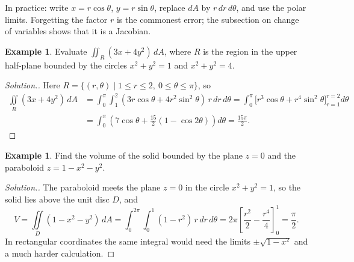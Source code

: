 \documentclass[11pt,a4paper]{article}
\theoremstyle{definition}
\newtheorem{exa}[thm]{Example}
\newenvironment{solution}
  {\renewcommand{\qedsymbol}{}\begin{proof}[\textit{Solution}.]}
  {\end{proof}}
\begin{document}
In practice: write $x = r\cos\theta$, $y = r\sin\theta$, replace $dA$ by
$r\,dr\,d\theta$, and use the polar limits. Forgetting the factor $r$ is the
commonest error; the subsection on change of variables shows that it is a
Jacobian.

\begin{exa}
\label{ex:polarannulus}
Evaluate $\iint_R (3x + 4y^2) \,dA$, where $R$ is the region in the upper
half-plane bounded by the circles $x^2 + y^2 = 1$ and $x^2 + y^2 = 4$.
\end{exa}

\begin{solution}
Here $R = \{ (r,\theta) \mid 1 \leq r \leq 2,\ 0\leq \theta \leq \pi\}$, so
\begin{align*}
\iint\limits_R (3x + 4y^2) \,dA & = \int^{\pi}_0\int^2_1(3r\cos \theta + 4r^2\sin^2
\theta )\, r\,dr\,d\theta = \int^{\pi}_0\Big[r^3\cos\theta +
r^4\sin^2\theta\Big]_{r=1}^{r=2}d\theta\\
& = \int^{\pi}_0\left(7\cos \theta + \frac{15}{2}( 1 - \cos 2\theta )\right)
d\theta = \frac{15\pi}{2} .
\end{align*}
\end{solution}

\begin{exa}
\label{ex:polarvolume}
Find the volume of the solid bounded by the plane $z = 0$ and the paraboloid
$z = 1-x^2 -y^2$.

\begin{figure}[H]
\centering
{}
\end{figure}
\end{exa}

\begin{solution}
The paraboloid meets the plane $z = 0$ in the circle $x^2 + y^2 = 1$, so the
solid lies above the unit disc $D$, and
\[V = \iint\limits_D (1-x^2-y^2)\,dA = \int^{2\pi}_0\int^1_0 ( 1 - r^2)\, r\,dr\,
d\theta = 2\pi\left[\frac{r^2}{2} - \frac{r^4}{4}\right]_0^1 = \frac{\pi}{2} .\]
In rectangular coordinates the same integral would need the limits
$\pm\sqrt{1 - x^2}$ and a much harder calculation.
\end{solution}
\end{document}

